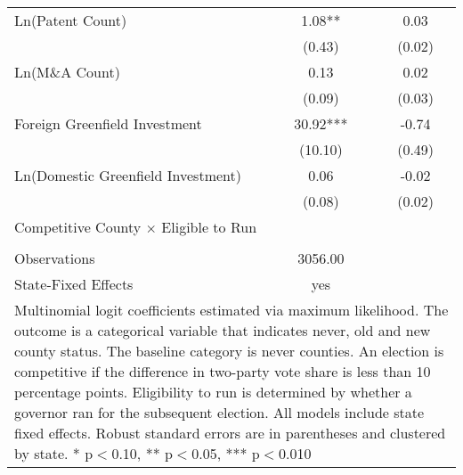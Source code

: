 \begin{table}[!htbp]
\begin{tabular}{l*{2}{c}}
Ln(Patent Count)    &        1.08** &        0.03   \\
                    &      (0.43)   &      (0.02)   \\
Ln(M\&A Count)      &        0.13   &        0.02   \\
                    &      (0.09)   &      (0.03)   \\
Foreign Greenfield Investment&       30.92***&       -0.74   \\
                    &     (10.10)   &      (0.49)   \\
Ln(Domestic Greenfield Investment)&        0.06   &       -0.02   \\
                    &      (0.08)   &      (0.02)   \\
Competitive County $\times$ Eligible to Run&               &               \\
                    &               &               \\
\hline
Observations        &     3056.00   &               \\
State-Fixed Effects &         yes   &               \\
\hline\hline
\multicolumn{3}{p{\linewidth}}{\footnotesize Multinomial logit coefficients estimated via maximum likelihood. The outcome is a categorical variable that indicates  never, old and new county status. The baseline category is never counties. An election is competitive if the difference in two-party vote share is less than 10 percentage points. Eligibility to run is determined by whether a governor ran for the subsequent election. All models include state fixed effects. Robust standard errors are in parentheses and clustered by state. * p$<$0.10, ** p$<$0.05, *** p$<$0.010}\\
\end{tabular}
\end{table}
